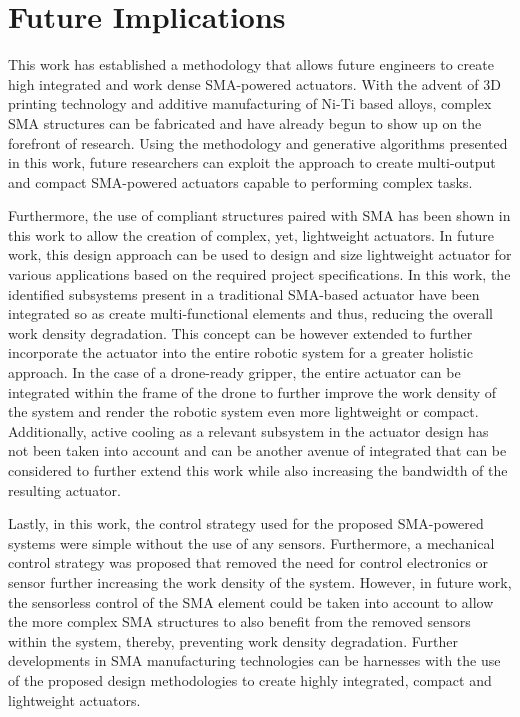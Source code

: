 \section*{Future Implications}
This work has established a methodology that allows future engineers to create high integrated and work dense SMA-powered actuators. With the advent of 3D printing technology and additive manufacturing of Ni-Ti based alloys, complex SMA structures can be fabricated and have already begun to show up on the forefront of research. Using the methodology and generative algorithms presented in this work, future researchers can exploit the approach to create multi-output and compact SMA-powered actuators capable to performing complex tasks.

Furthermore, the use of compliant structures paired with SMA has been shown in this work to allow the creation of complex, yet, lightweight actuators. In future work, this design approach can be used to design and size lightweight actuator for various applications based on the required project specifications. In this work, the identified subsystems present in a traditional SMA-based actuator have been integrated so as create multi-functional elements and thus, reducing the overall work density degradation. This concept can be however extended to further incorporate the actuator into the entire robotic system for a greater holistic approach. In the case of a drone-ready gripper, the entire actuator can be integrated within the frame of the drone to further improve the work density of the system and render the robotic system even more lightweight or compact. Additionally, active cooling as a relevant subsystem in the actuator design has not been taken into account and can be another avenue of integrated that can be considered to further extend this work while also increasing the bandwidth of the resulting actuator.

Lastly, in this work, the control strategy used for the proposed SMA-powered systems were simple without the use of any sensors. Furthermore, a mechanical control strategy was proposed that removed the need for control electronics or sensor further increasing the work density of the system. However, in future work, the sensorless control of the SMA element could be taken into account to allow the more complex SMA structures to also benefit from the removed sensors within the system, thereby, preventing work density degradation. Further developments in SMA manufacturing technologies can be harnesses with the use of the proposed design methodologies to create highly integrated, compact and lightweight actuators.
